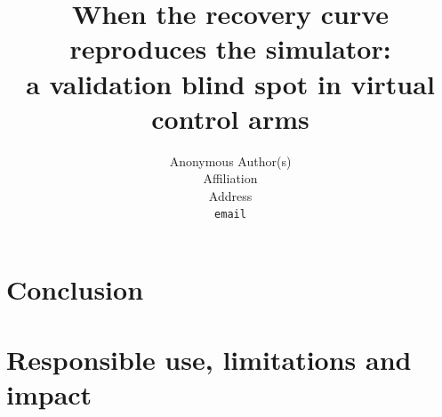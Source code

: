 \documentclass{article}
\title{When the recovery curve reproduces the simulator:\\
a validation blind spot in virtual control arms}
\author{%
  Anonymous Author(s) \\
  Affiliation \\
  Address \\
  \texttt{email} \\
}
\begin{document}
\maketitle








\section{Conclusion}
\label{sec:conclusion}



\section{Responsible use, limitations and impact}
\label{sec:responsible}






\clearpage


\end{document}
